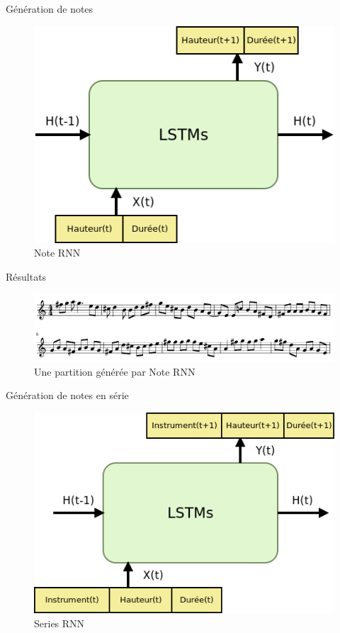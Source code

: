 \documentclass{beamer}
\begin{document}
\begin{frame}{Génération de notes}
\begin{figure}
\begin{center}
\includegraphics[scale=0.5]{images/note_rnn.png}
\caption{Note RNN}
\end{center}
\end{figure}
\end{frame}

\begin{frame}{Résultats}
\begin{figure}
\begin{center}
\includegraphics[scale=0.3]{images/note_rnn_result.png}
\caption{Une partition générée par Note RNN}
\end{center}
\end{figure}
\end{frame}

\begin{frame}{Génération de notes en série}
\begin{figure}
\begin{center}
\includegraphics[scale=0.5]{images/series_rnn.png}
\caption{Series RNN}
\end{center}
\end{figure}
\end{frame}
\end{document}
